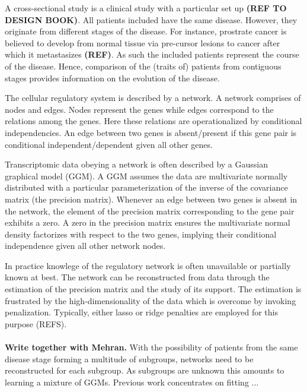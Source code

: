 \documentclass[10pt]{article}
\begin{document}

A cross-sectional study is a clinical study with a particular set up \textbf{(REF TO DESIGN BOOK)}. All patients included have the same disease. However, they originate from different stages of the disease. For instance, prostrate cancer is believed to develop from normal tissue via pre-cursor lesions to cancer after which it metastasizes \textbf{(REF)}. As such the included patients represent the course of the disease. Hence, comparison of the (traits of) patients from contiguous stages provides information on the evolution of the disease.

The cellular regulatory system is described by a network. A network comprises of nodes and edges. Nodes represent the genes while edges correspond to the relations among the genes. Here these relations are operationalized by conditional independencies. An edge between two genes is absent/present if this gene pair is conditional independent/dependent given all other genes.

Transcriptomic data obeying a network is often described by a Gaussian graphical model (GGM). A GGM assumes the data are multivariate normally  distributed with a particular parameterization of the inverse of the covariance matrix (the precision matrix). Whenever an edge between two genes is absent in the network, the element of the precision matrix corresponding to the gene pair exhibits a zero. A zero in the precision matrix ensures the multivariate normal density factorizes with respect to the two genes, implying their conditional independence given all other network nodes.

In practice knowlege of the regulatory network is often unavailable or partially known at best. The network can be reconstructed from data through the estimation of the precision matrix and the study of its support. The estimation is frustrated by the high-dimensionality of the data which is overcome by invoking penalization. Typically, either lasso or ridge penalties are employed for this purpose (REFS).
\\
\\
\textbf{Write together with Mehran.}
With the possibility of patients from the same disease stage forming a multitude of subgroups, networks need to be reconstructed for each subgroup. As subgroups are unknown this amounts to learning a mixture of GGMs. Previous work concentrates on fitting ...
\end{document}
